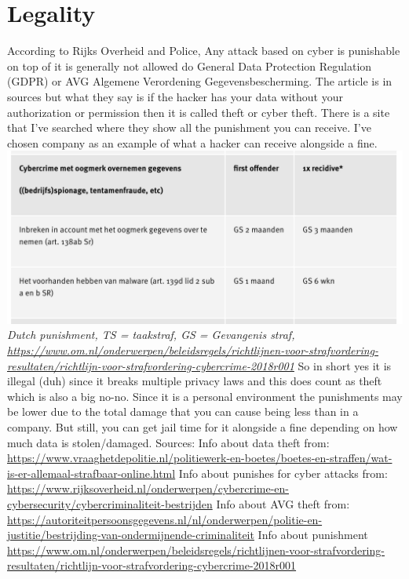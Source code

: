 \documentclass[12pt, letterpaper]{article}
\begin{document}
\section{Legality}
According to Rijks Overheid and Police, Any attack based on cyber is punishable on top of it is generally not allowed do General Data Protection Regulation (GDPR) or AVG Algemene Verordening Gegevensbescherming. The article is in sources but what they say is if the hacker has your data without your authorization or permission then it is called theft or cyber theft. There is a site that I've searched where they show all the punishment you can receive. I've chosen company as an example of what a hacker can receive alongside a fine.
\includegraphics[width=1\textwidth]{fotos/PVI/Boete.jpeg}
\break
\emph{Dutch punishment, TS = taakstraf, GS = Gevangenis straf, \url{https://www.om.nl/onderwerpen/beleidsregels/richtlijnen-voor-strafvordering-resultaten/richtlijn-voor-strafvordering-cybercrime-2018r001}}
\hfill\break
\hfill\break
So in short yes it is illegal (duh) since it breaks multiple privacy laws and this does count as theft which is also a big no-no. Since it is a personal environment the punishments may be lower due to the total damage that you can cause being less than in a company. But still, you can get jail time for it alongside a fine depending on how much data is stolen/damaged. 
\hfill\break
\hfill\break
Sources:
\hfill\break
Info about data theft from: \url{https://www.vraaghetdepolitie.nl/politiewerk-en-boetes/boetes-en-straffen/wat-is-er-allemaal-strafbaar-online.html} 
Info about punishes for cyber attacks from: \url{https://www.rijksoverheid.nl/onderwerpen/cybercrime-en-cybersecurity/cybercriminaliteit-bestrijden}
Info about AVG theft from: \url{https://autoriteitpersoonsgegevens.nl/nl/onderwerpen/politie-en-justitie/bestrijding-van-ondermijnende-criminaliteit}
Info about punishment \url{https://www.om.nl/onderwerpen/beleidsregels/richtlijnen-voor-strafvordering-resultaten/richtlijn-voor-strafvordering-cybercrime-2018r001}
\end{document}
